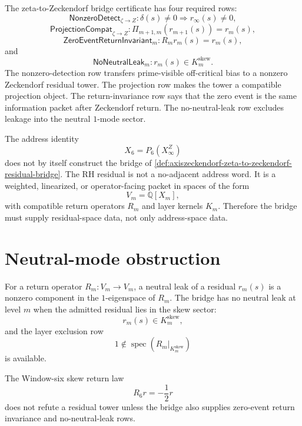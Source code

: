 \begin{definition}
\label{def:axiszeckendorf-zeta-bridge-certificate-rows}
The zeta-to-Zeckendorf bridge certificate has four required rows:
$$
\mathsf{NonzeroDetect}_{\zeta\to Z}:
\delta(s)\neq0\Longrightarrow r_\infty(s)\neq0,
$$
$$
\mathsf{ProjectionCompat}_{\zeta\to Z}:
\Pi_{m+1,m}(r_{m+1}(s))=r_m(s),
$$
$$
\mathsf{ZeroEventReturnInvariant}_{m}:
R_mr_m(s)=r_m(s),
$$
and
$$
\mathsf{NoNeutralLeak}_{m}:
r_m(s)\in K_m^{\mathrm{skew}}.
$$
The nonzero-detection row transfers prime-visible off-critical bias to a
nonzero Zeckendorf residual tower.  The projection row makes the tower a
compatible projection object.  The return-invariance row says that the zero
event is the same information packet after Zeckendorf return.  The
no-neutral-leak row excludes leakage into the neutral $1$-mode sector.
\end{definition}

\begin{principle}
\label{prin:axiszeckendorf-address-not-residual-dynamics}
The address identity
$$
X_6=P_6(X_\infty^Z)
$$
does not by itself construct the bridge of
\autoref{def:axiszeckendorf-zeta-to-zeckendorf-residual-bridge}.  The RH
residual is not a no-adjacent address word.  It is a weighted, linearized, or
operator-facing packet in spaces of the form
$$
V_m=\mathbb Q[X_m],
$$
with compatible return operators $R_m$ and layer kernels $K_m$.  Therefore
the bridge must supply residual-space data, not only address-space data.
\end{principle}

\section{Neutral-mode obstruction}
\label{sec:axiszeckendorf-neutral-mode-obstruction}

\begin{definition}
\label{def:axiszeckendorf-neutral-leak}
For a return operator $R_m:V_m\to V_m$, a neutral leak of a residual
$r_m(s)$ is a nonzero component in the $1$-eigenspace of $R_m$.  The bridge
has no neutral leak at level $m$ when the admitted residual lies in the skew
sector:
$$
r_m(s)\in K_m^{\mathrm{skew}},
$$
and the layer exclusion row
$$
1\notin\operatorname{spec}(R_m|_{K_m^{\mathrm{skew}}})
$$
is available.
\end{definition}

\begin{proposition}
\label{prop:axiszeckendorf-return-eigenvalue-alone-insufficient}
The Window-six skew return law
$$
R_6r=-\frac{1}{2}r
$$
does not refute a residual tower unless the bridge also supplies
zero-event return invariance and no-neutral-leak rows.
\end{proposition}

